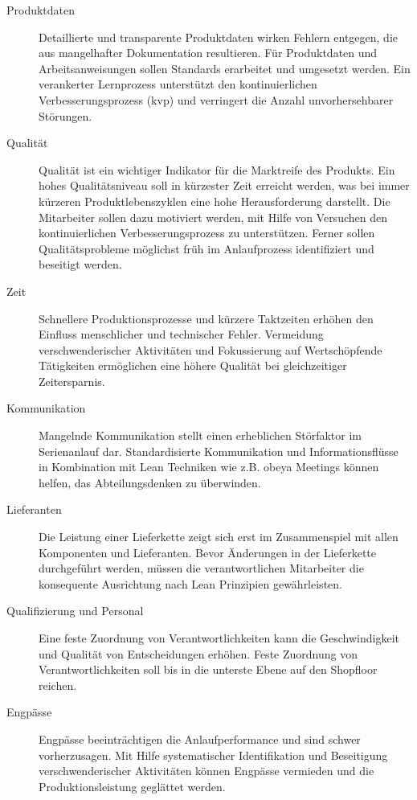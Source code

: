 \begin{description}
\item[Produktdaten]
Detaillierte und transparente Produktdaten wirken Fehlern entgegen, die aus mangelhafter Dokumentation resultieren. 
Für Produktdaten und Arbeitsanweisungen sollen Standards erarbeitet und umgesetzt werden. Ein verankerter Lernprozess unterstützt den kontinuierlichen Verbesserungsprozess (\gls{kvp}) und verringert die Anzahl unvorhersehbarer Störungen. 


\item[Qualität]
Qualität ist ein wichtiger Indikator für die Marktreife des Produkts. Ein hohes Qualitätsniveau soll in kürzester Zeit erreicht werden, was bei immer kürzeren Produktlebenszyklen eine hohe Herausforderung darstellt. 
%
Die Mitarbeiter sollen dazu motiviert werden, mit Hilfe von Versuchen den kontinuierlichen Verbesserungsprozess zu unterstützen. Ferner sollen Qualitätsprobleme möglichst früh im Anlaufprozess identifiziert und beseitigt werden. 

\item[Zeit]
Schnellere Produktionsprozesse und kürzere Taktzeiten erhöhen den Einfluss menschlicher und technischer Fehler. 
%
Vermeidung verschwenderischer Aktivitäten und Fokussierung auf Wertschöpfende Tätigkeiten ermöglichen eine höhere Qualität bei gleichzeitiger Zeitersparnis. 

\item[Kommunikation]
Mangelnde Kommunikation stellt einen erheblichen Störfaktor im Serienanlauf dar. 
%
Standardisierte Kommunikation und Informationsflüsse in Kombination mit Lean Techniken wie z.B. \gls{obeya} Meetings können helfen, das Abteilungsdenken zu überwinden. 

\item[Lieferanten]
Die Leistung einer Lieferkette zeigt sich erst im Zusammenspiel mit allen Komponenten und Lieferanten. 
Bevor Änderungen in der Lieferkette durchgeführt werden, müssen die verantwortlichen Mitarbeiter die konsequente Ausrichtung nach Lean Prinzipien gewährleisten. 

\item[Qualifizierung und Personal]
Eine feste Zuordnung von Verantwortlichkeiten kann die Geschwindigkeit und Qualität von Entscheidungen erhöhen. 
Feste Zuordnung von Verantwortlichkeiten soll bis in die unterste Ebene auf den Shopfloor reichen.


\item[Engpässe]
Engpässe beeinträchtigen die Anlaufperformance und sind schwer vorherzusagen. 
%
Mit Hilfe systematischer Identifikation und Beseitigung verschwenderischer Aktivitäten können Engpässe vermieden und die Produktionsleistung geglättet werden. 
\end{description}


